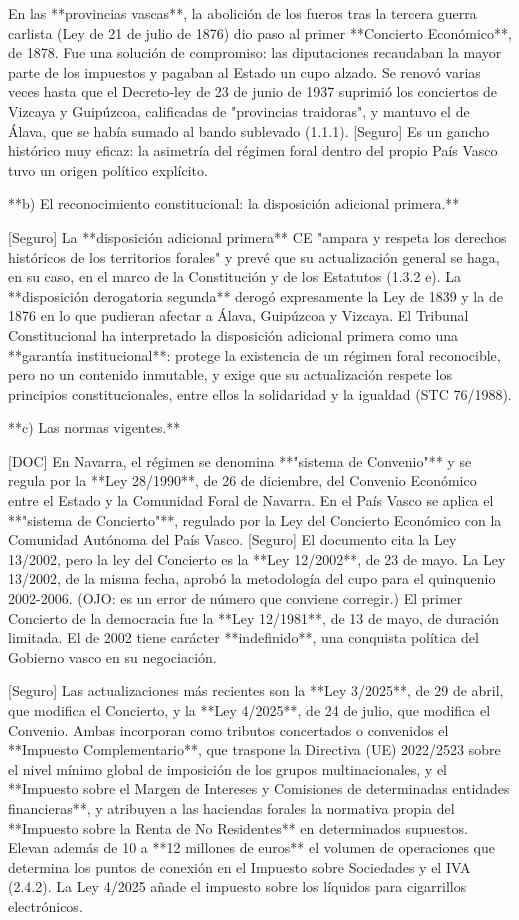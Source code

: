 \documentclass[10pt,a4paper]{article}
\begin{document}
En las **provincias vascas**, la abolición de los fueros tras la tercera guerra carlista (Ley de 21 de julio de 1876) dio paso al primer **Concierto Económico**, de 1878. Fue una solución de compromiso: las diputaciones recaudaban la mayor parte de los impuestos y pagaban al Estado un cupo alzado. Se renovó varias veces hasta que el Decreto-ley de 23 de junio de 1937 suprimió los conciertos de Vizcaya y Guipúzcoa, calificadas de "provincias traidoras", y mantuvo el de Álava, que se había sumado al bando sublevado (1.1.1). [Seguro] Es un gancho histórico muy eficaz: la asimetría del régimen foral dentro del propio País Vasco tuvo un origen político explícito.

**b) El reconocimiento constitucional: la disposición adicional primera.**

[Seguro] La **disposición adicional primera** CE "ampara y respeta los derechos históricos de los territorios forales" y prevé que su actualización general se haga, en su caso, en el marco de la Constitución y de los Estatutos (1.3.2 e). La **disposición derogatoria segunda** derogó expresamente la Ley de 1839 y la de 1876 en lo que pudieran afectar a Álava, Guipúzcoa y Vizcaya. El Tribunal Constitucional ha interpretado la disposición adicional primera como una **garantía institucional**: protege la existencia de un régimen foral reconocible, pero no un contenido inmutable, y exige que su actualización respete los principios constitucionales, entre ellos la solidaridad y la igualdad (STC 76/1988).

**c) Las normas vigentes.**

[DOC] En Navarra, el régimen se denomina **"sistema de Convenio"** y se regula por la **Ley 28/1990**, de 26 de diciembre, del Convenio Económico entre el Estado y la Comunidad Foral de Navarra. En el País Vasco se aplica el **"sistema de Concierto"**, regulado por la Ley del Concierto Económico con la Comunidad Autónoma del País Vasco. [Seguro] El documento cita la Ley 13/2002, pero la ley del Concierto es la **Ley 12/2002**, de 23 de mayo. La Ley 13/2002, de la misma fecha, aprobó la metodología del cupo para el quinquenio 2002-2006. (OJO: es un error de número que conviene corregir.) El primer Concierto de la democracia fue la **Ley 12/1981**, de 13 de mayo, de duración limitada. El de 2002 tiene carácter **indefinido**, una conquista política del Gobierno vasco en su negociación.

[Seguro] Las actualizaciones más recientes son la **Ley 3/2025**, de 29 de abril, que modifica el Concierto, y la **Ley 4/2025**, de 24 de julio, que modifica el Convenio. Ambas incorporan como tributos concertados o convenidos el **Impuesto Complementario**, que traspone la Directiva (UE) 2022/2523 sobre el nivel mínimo global de imposición de los grupos multinacionales, y el **Impuesto sobre el Margen de Intereses y Comisiones de determinadas entidades financieras**, y atribuyen a las haciendas forales la normativa propia del **Impuesto sobre la Renta de No Residentes** en determinados supuestos. Elevan además de 10 a **12 millones de euros** el volumen de operaciones que determina los puntos de conexión en el Impuesto sobre Sociedades y el IVA (2.4.2). La Ley 4/2025 añade el impuesto sobre los líquidos para cigarrillos electrónicos.
\end{document}
